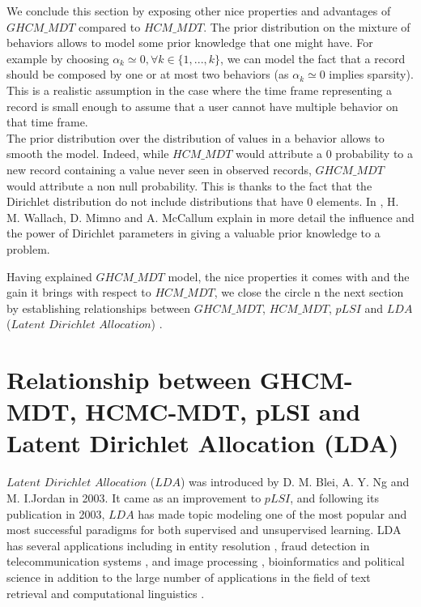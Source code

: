 We conclude this section by exposing other nice properties and advantages of $GHCM\_MDT$ compared to $HCM\_MDT$. The prior distribution on the mixture of behaviors allows to model some prior knowledge that one might have. For example by choosing $\alpha _{k}\simeq 0, \forall k\in \{1,...,k\}$, we can model the fact that a record should be composed by one or at most two behaviors (as $\alpha _{k}\simeq 0$ implies sparsity). This is a realistic assumption in the case where the time frame representing a record is small enough to assume that a user cannot have multiple behavior on that time frame.
\\The prior distribution over the distribution of values in a behavior allows to smooth the model. Indeed, while $HCM\_MDT$ would attribute a $0$ probability to a new record containing a value never seen in observed records, $GHCM\_MDT$ would attribute a non null probability. This is thanks to the fact that the Dirichlet distribution do not include distributions that have $0$ elements. In \cite{dirinf}, H. M. Wallach, D. Mimno and A. McCallum explain in more detail the influence and the power of Dirichlet parameters in giving a valuable prior knowledge to a problem.\par

Having explained $GHCM\_MDT$ model, the nice properties it comes with and the gain it brings with respect to $HCM\_MDT$, we close the circle n the next section by establishing relationships between $GHCM\_MDT$, $HCM\_MDT$, $pLSI$ and $LDA$ ($Latent$ $Dirichlet$ $Allocation$) \cite{lda}.

\section{Relationship between GHCM-MDT, HCMC-MDT, pLSI and Latent Dirichlet Allocation (LDA)} \label{relationshipghcmmdt}
$Latent$ $Dirichlet$ $Allocation$ ($LDA$) was introduced by D. M. Blei, A. Y. Ng and M. I.Jordan \cite{lda} in 2003. It came as an improvement to $pLSI$, and following its publication in 2003, $LDA$\cite{lda} has made topic modeling one of the most popular and most successful paradigms for both supervised and unsupervised learning. LDA has several applications including in entity resolution  \cite{ldaex1}, fraud detection in telecommunication systems \cite{ldaex2}, and image processing \cite{ldaex3, daex4}, bioinformatics \cite{ldaex5} and political science \cite{ldaex6} in addition to the large number of applications in the field of text retrieval and computational linguistics \cite{ldaex7}. \par


